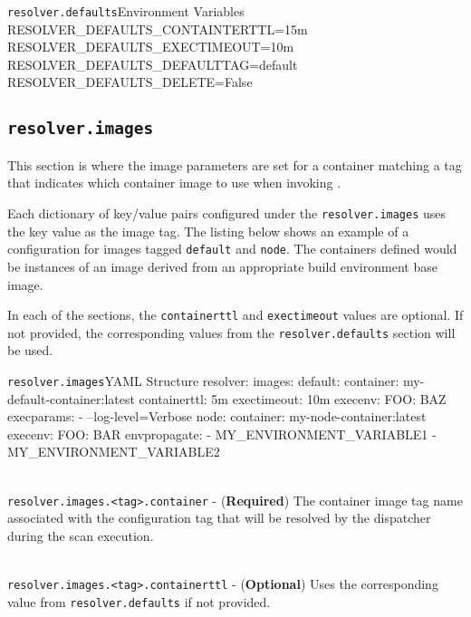\begin{code}{\texttt{resolver.defaults}}{Environment Variables}{}
RESOLVER_DEFAULTS_CONTAINTERTTL=15m
RESOLVER_DEFAULTS_EXECTIMEOUT=10m
RESOLVER_DEFAULTS_DEFAULTTAG=default
RESOLVER_DEFAULTS_DELETE=False
\end{code}

\subsection{\texttt{resolver.images}}

This section is where the image parameters are set for a container matching a tag that indicates 
which container image to use when invoking \scaresolver.

Each dictionary of key/value pairs configured under the \texttt{resolver.images} uses the key value 
as the image tag.  The listing below shows an example of a configuration for images 
tagged \texttt{default} and \texttt{node}.  The containers defined would be instances of 
an \scaresolver image derived from an appropriate build environment base image.

In each of the sections, the \texttt{containerttl} and \texttt{exectimeout} values are optional.  
If not provided, the corresponding values from the \texttt{resolver.defaults} section will be used.\\


\begin{code}{\texttt{resolver.images}}{YAML Structure}{}
resolver:
    images:
        default:
            container: my-default-container:latest
            containerttl: 5m
            exectimeout: 10m
            execenv:
                FOO: BAZ
            execparams:
                - --log-level=Verbose
        node: 
            container: my-node-container:latest
            execenv:
                FOO: BAR
            envpropagate:
                - MY_ENVIRONMENT_VARIABLE1
                - MY_ENVIRONMENT_VARIABLE2
\end{code}



\noindent\\\texttt{resolver.images.<tag>.container} - (\textbf{Required}) The container image tag 
name associated with the configuration tag that will be resolved by the dispatcher
during the \cxflowplusplus scan execution.  

\noindent\\\texttt{resolver.images.<tag>.containerttl} - (\textbf{Optional})  Uses the 
corresponding value from \texttt{resolver.defaults} if not provided.

